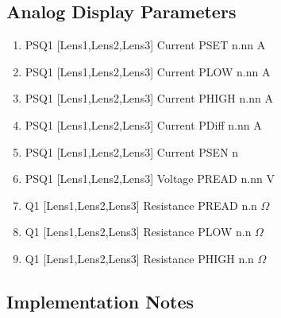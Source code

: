 \documentclass[11pt]{book}		%
\begin{document}
\subsection{Analog Display Parameters} \label{sect:cyc-op-interface-status-beamline-tofc1-analog-display}

\begin{enumerate}
 \item PSQ1 [Lens1,Lens2,Lens3] Current PSET  n.nn A
 \item PSQ1 [Lens1,Lens2,Lens3] Current PLOW  n.nn A
 \item PSQ1 [Lens1,Lens2,Lens3] Current PHIGH n.nn A
 \item PSQ1 [Lens1,Lens2,Lens3] Current PDiff n.nn A
 \item PSQ1 [Lens1,Lens2,Lens3] Current PSEN  n
 \item PSQ1 [Lens1,Lens2,Lens3] Voltage PREAD n.nn V
 \item Q1 [Lens1,Lens2,Lens3] Resistance PREAD n.n $\Omega$
 \item Q1 [Lens1,Lens2,Lens3] Resistance PLOW n.n $\Omega$
 \item Q1 [Lens1,Lens2,Lens3] Resistance PHIGH n.n $\Omega$
\end{enumerate}

\subsection{Implementation Notes} \label{sect:cyc-op-interface-status-beamline-tofc1-implementation-notes}
\end{document}
